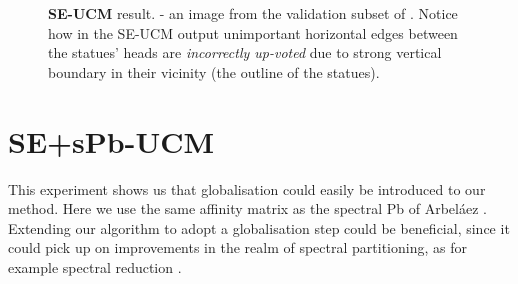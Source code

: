 \begin{figure}[ht!]
\centering
{}
\caption[SE-UCM drawback - ``bleeding'' of strong edges towards unimportant ones]{{\bf SE-UCM} result. \protect{} - an image from the validation subset of \cite{BSDS500resources}. Notice how in the SE-UCM output \protect{} unimportant horizontal edges between the statues' heads are {\it incorrectly %
up-voted} due to strong vertical boundary in their vicinity (the outline of the statues).}
\label{fig:SE-UCM-tikis-bleeding}
\end{figure}

\section{SE+sPb-UCM}
This experiment shows us that globalisation could easily be introduced to our method. Here we use the same affinity matrix as the spectral Pb of Arbel\'aez \etal \cite{Arbelaez11}. Extending our algorithm to adopt a globalisation step could be beneficial, since it could pick up on improvements in the realm of spectral partitioning, as for example spectral reduction \cite{Galasso14}. %

